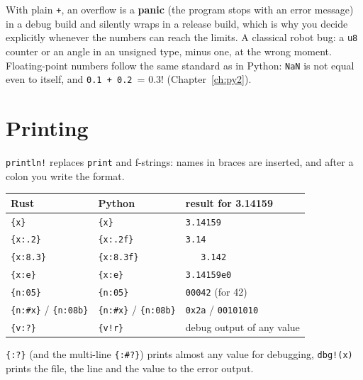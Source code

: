\begin{center}
\end{center}
With plain \verb!+!, an overflow is a \textbf{panic} (the program stops with an error message) in a debug build and silently wraps in a release build, which is why you decide explicitly whenever the numbers can reach the limits. A classical robot bug: a \verb!u8! counter or an angle in an unsigned type, minus one, at the wrong moment. Floating-point numbers follow the same standard as in Python: \verb!NaN! is not equal even to itself, and \verb!0.1 + 0.2 != 0.3! (Chapter~\ref{ch:py2}).

\section*{Printing}
\verb|println!| replaces \verb!print! and f-strings: names in braces are inserted, and after a colon you write the format.
\begin{center}
\renewcommand{\arraystretch}{1.2}
\begin{tabular}{lll}
\textbf{Rust} & \textbf{Python} & \textbf{result for 3.14159}\\ \hline
\verb!{x}! & \verb!{x}! & \texttt{3.14159}\\
\verb!{x:.2}! & \verb!{x:.2f}! & \texttt{3.14}\\
\verb!{x:8.3}! & \verb!{x:8.3f}! & \texttt{\ \ \ 3.142}\\
\verb!{x:e}! & \verb!{x:e}! & \texttt{3.14159e0}\\
\verb!{n:05}! & \verb!{n:05}! & \texttt{00042} (for 42)\\
\verb!{n:#x}! / \verb!{n:08b}! & \verb!{n:#x}! / \verb!{n:08b}! & \texttt{0x2a} / \texttt{00101010}\\
\verb!{v:?}! & \verb|{v!r}| & debug output of any value\\
\end{tabular}
\end{center}
\verb!{:?}! (and the multi-line \verb!{:#?}!) prints almost any value for debugging, \verb|dbg!(x)| prints the file, the line and the value to the error output.

